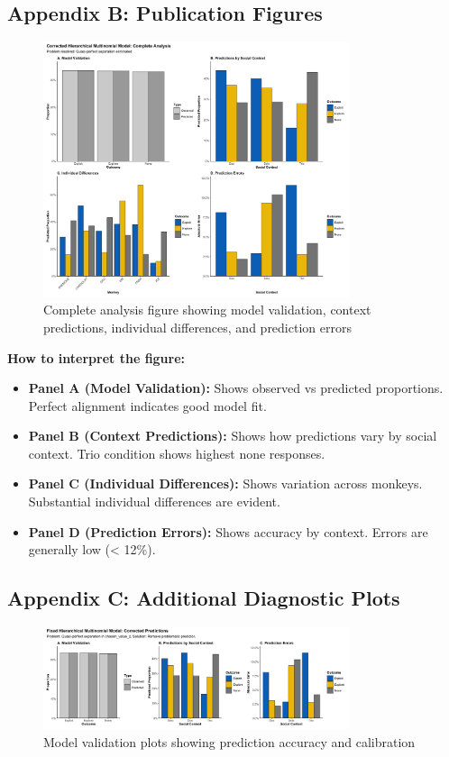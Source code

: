 \documentclass[11pt]{article}
\begin{document}
\subsection{Appendix B: Publication Figures}

\begin{figure}[h]
\centering
\includegraphics[width=0.8\textwidth]{Final_Corrected_Analysis.png}
\caption{Complete analysis figure showing model validation, context predictions, individual differences, and prediction errors}
\end{figure}

\textbf{How to interpret the figure:}
\begin{itemize}
    \item \textbf{Panel A (Model Validation):} Shows observed vs predicted proportions. Perfect alignment indicates good model fit.
    \item \textbf{Panel B (Context Predictions):} Shows how predictions vary by social context. Trio condition shows highest none responses.
    \item \textbf{Panel C (Individual Differences):} Shows variation across monkeys. Substantial individual differences are evident.
    \item \textbf{Panel D (Prediction Errors):} Shows accuracy by context. Errors are generally low (< 12\%).
\end{itemize}

\subsection{Appendix C: Additional Diagnostic Plots}

\begin{figure}[h]
\centering
\includegraphics[width=0.8\textwidth]{Fixed_Model_Validation.png}
\caption{Model validation plots showing prediction accuracy and calibration}
\end{figure}
\end{document}
